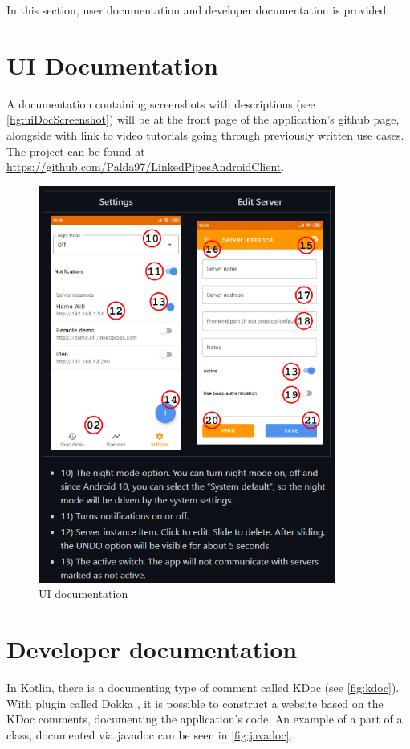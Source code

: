In this section, user documentation and developer documentation is provided.

\section{UI Documentation}
A documentation containing screenshots with descriptions (see \autoref{fig:uiDocScreenshot}) will be at the front page of the application's github page, alongside with link to video tutorials going through previously written use cases.
The project can be found at \url{https://github.com/Palda97/LinkedPipesAndroidClient}.

\begin{figure}\centering
	\includegraphics[width=0.87\textwidth]{pics/uiDocScreenshot.png}
	\caption[UI documentation]{UI documentation}\label{fig:uiDocScreenshot}
\end{figure}

\section{Developer documentation}
In Kotlin, there is a documenting type of comment called KDoc (see \autoref{fig:kdoc}).
With plugin called Dokka \cite{dokka}, it is possible to construct a website based on the KDoc comments, documenting the application's code.
An example of a part of a class, documented via javadoc can be seen in \autoref{fig:javadoc}.

